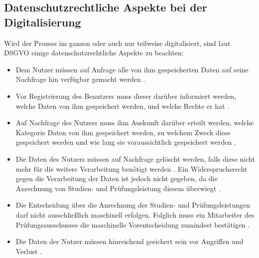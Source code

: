 \subsection{Datenschutzrechtliche Aspekte bei der Digitalisierung}
Wird der Prozess im ganzen oder auch nur teilweise digitalisiert, sind laut DSGVO einige datenschutzrechtliche Aspekte zu beachten:
\begin{itemize}
\item Dem Nutzer müssen auf Anfrage alle von ihm gespeicherten Daten auf seine Nachfrage hin verfügbar gemacht werden \parencite{dsgvo}.
\item Vor Registrierung des Benutzers muss dieser darüber informiert werden, welche Daten von ihm gespeichert werden, und welche Rechte er hat \parencite{dsgvo}.
\item Auf Nachfrage des Nutzers muss ihm Auskunft darüber erteilt werden, welche Kategorie Daten von ihm gespeichert werden, zu welchem Zweck diese gespeichert werden und wie lang sie voraussichtlich gespeichert werden \parencite{dsgvo}.
\item Die Daten des Nutzers müssen auf Nachfrage gelöscht werden, falls diese nicht mehr für die weitere Verarbeitung benötigt werden \parencite{dsgvo}. Ein Widerspruchsrecht gegen die Verarbeitung der Daten ist jedoch nicht gegeben, da die Anrechnung von Studien- und Prüfungsleistung diesem überwiegt \parencite{dsgvo}.
\item Die Entscheidung über die Anrechnung der Studien- und Prüfungsleistungen darf nicht ausschließlich maschinell erfolgen. Folglich muss ein Mitarbeiter des Prüfungsausschusses die maschinelle Vorentscheidung zumindest bestätigen \parencite{dsgvo}.
\item Die Daten der Nutzer müssen hinreichend gesichert sein vor Angriffen und Verlust \parencite{dsgvo}.
\end{itemize}
